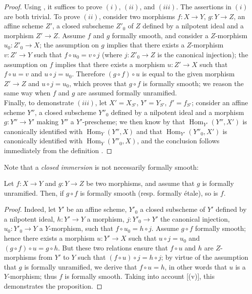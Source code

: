 \begin{proof}
Using , it suffices to prove $(i)$, $(ii)$, and $(iii)$. 
The assertions in $(i)$ are both trivial. To prove $(ii)$, consider two morphisms $f: X \to Y$, $g: Y \to Z$, an affine scheme $Z'$, a closed subscheme $Z'_0$ of $Z$ defined by a nilpotent ideal and a morphism $Z' \to Z$. 
Assume $f$ and $g$ formally smooth, and consider a $Z$-morphism $u_0 : Z'_0 \to X$; the assumption on $g$ implies that there exists a $Z$-morphism $v: Z' \to Y$ such that $f \circ u_0 = v \circ j$ (where $j : Z'_0 \to Z$ is the canonical injection); the assumption on $f$ implies that there exists a morphism $u : Z' \to X$ such that $f \circ u = v$ and $u \circ j = u_0$. 
Therefore $(g \circ f) \circ u$ is equal to the given morphism $Z' \to Z$ and $u \circ j = u_0$, which proves that $g \circ f$ is formally smooth; we reason the same way when $f$ and $g$ are assumed formally unramified.\\
Finally, to demonstrate $(iii)$, let $X' = X_{S'}$, $Y' = Y_{S'}$, $f' = f_{S'}$; consider an affine scheme $Y''$, a closed subscheme $Y''_0$ defined by a nilpotent ideal and a morphism $g : Y'' \to Y'$ making $Y''$ a $Y'$-prescheme; we then know by  that $\operatorname{Hom}_{Y'}(Y'', X')$ is canonically identified with $\operatorname{Hom}_{Y}(Y'', X)$ and that $\operatorname{Hom}_{Y'}(Y''_0, X')$ is canonically identified with $\operatorname{Hom}_{Y}(Y''_0, X)$, and the conclusion follows immediately from the definition .
\end{proof}

Note that a \emph{closed immersion} is not necessarily formally smooth:
\begin{proposition}[17.1.4]
\label{IV.17.1.4}
	Let $f: X \to Y$ and $g: Y \to Z$ be two morphisms, and assume that $g$ is formally unramified. Then, if $g \circ f$ is formally smooth (resp. formally \'etale), so is $f$.
\end{proposition}

\begin{proof}
Indeed, let $Y'$ be an affine scheme, $Y'_0$ a closed subscheme of $Y'$ defined by a nilpotent ideal, $h: Y' \to Y$ a morphism, $j: Y'_0 \to Y'$ the canonical injection, $u_0: Y'_0 \to Y$ a $Y$-morphism, such that $f \circ u_0 = h \circ j$. 
Assume $g \circ f$ formally smooth; hence there exists a morphism $u : Y' \to X$ such that $u \circ j = u_0$ and $(g\circ f) \circ u = g \circ h$. 
But these two relations ensure that $f \circ u$ and $h$ are $Z$-morphisms from $Y'$ to $Y$ such that $(f\circ u)\circ j = h \circ j$; by virtue of the assumption that $g$ is formally unramified, we derive that $f \circ u = h$, in other words that $u$ is a $Y$-morphism; thus $f$ is formally smooth. 
Taking into account [(v)], this demonstrates the proposition. 
\end{proof}

